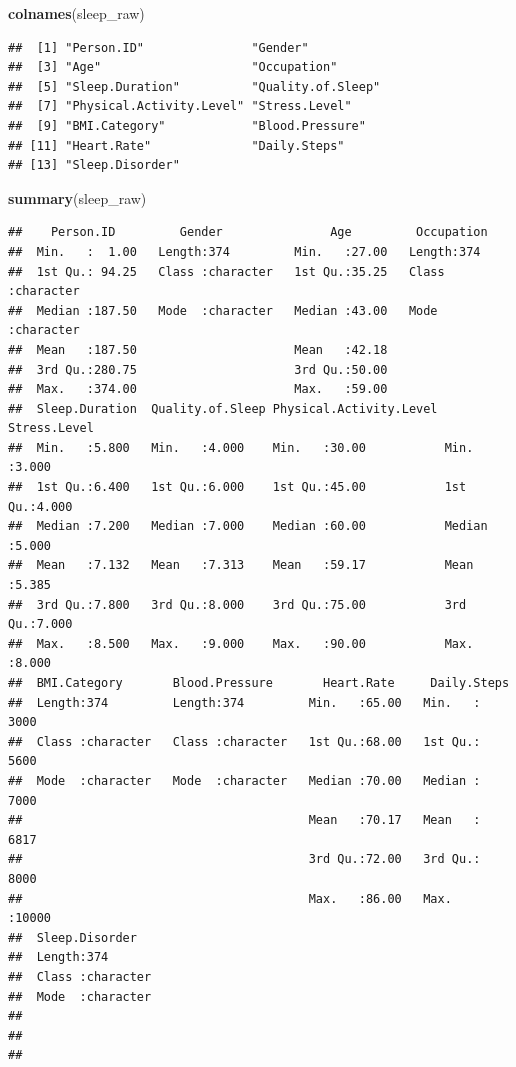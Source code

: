 \documentclass[
]{article}
\newenvironment{Shaded}{\begin{snugshade}}{\end{snugshade}}
\newcommand{\FunctionTok}[1]{\textcolor[rgb]{0.13,0.29,0.53}{\textbf{#1}}}
\newcommand{\NormalTok}[1]{#1}
\begin{document}
\begin{Shaded}
\begin{Highlighting}[]
\FunctionTok{colnames}\NormalTok{(sleep\_raw)}
\end{Highlighting}
\end{Shaded}

\begin{verbatim}
##  [1] "Person.ID"               "Gender"                 
##  [3] "Age"                     "Occupation"             
##  [5] "Sleep.Duration"          "Quality.of.Sleep"       
##  [7] "Physical.Activity.Level" "Stress.Level"           
##  [9] "BMI.Category"            "Blood.Pressure"         
## [11] "Heart.Rate"              "Daily.Steps"            
## [13] "Sleep.Disorder"
\end{verbatim}

\begin{Shaded}
\begin{Highlighting}[]
\FunctionTok{summary}\NormalTok{(sleep\_raw)}
\end{Highlighting}
\end{Shaded}

\begin{verbatim}
##    Person.ID         Gender               Age         Occupation       
##  Min.   :  1.00   Length:374         Min.   :27.00   Length:374        
##  1st Qu.: 94.25   Class :character   1st Qu.:35.25   Class :character  
##  Median :187.50   Mode  :character   Median :43.00   Mode  :character  
##  Mean   :187.50                      Mean   :42.18                     
##  3rd Qu.:280.75                      3rd Qu.:50.00                     
##  Max.   :374.00                      Max.   :59.00                     
##  Sleep.Duration  Quality.of.Sleep Physical.Activity.Level  Stress.Level  
##  Min.   :5.800   Min.   :4.000    Min.   :30.00           Min.   :3.000  
##  1st Qu.:6.400   1st Qu.:6.000    1st Qu.:45.00           1st Qu.:4.000  
##  Median :7.200   Median :7.000    Median :60.00           Median :5.000  
##  Mean   :7.132   Mean   :7.313    Mean   :59.17           Mean   :5.385  
##  3rd Qu.:7.800   3rd Qu.:8.000    3rd Qu.:75.00           3rd Qu.:7.000  
##  Max.   :8.500   Max.   :9.000    Max.   :90.00           Max.   :8.000  
##  BMI.Category       Blood.Pressure       Heart.Rate     Daily.Steps   
##  Length:374         Length:374         Min.   :65.00   Min.   : 3000  
##  Class :character   Class :character   1st Qu.:68.00   1st Qu.: 5600  
##  Mode  :character   Mode  :character   Median :70.00   Median : 7000  
##                                        Mean   :70.17   Mean   : 6817  
##                                        3rd Qu.:72.00   3rd Qu.: 8000  
##                                        Max.   :86.00   Max.   :10000  
##  Sleep.Disorder    
##  Length:374        
##  Class :character  
##  Mode  :character  
##                    
##                    
## 
\end{verbatim}
\end{document}
